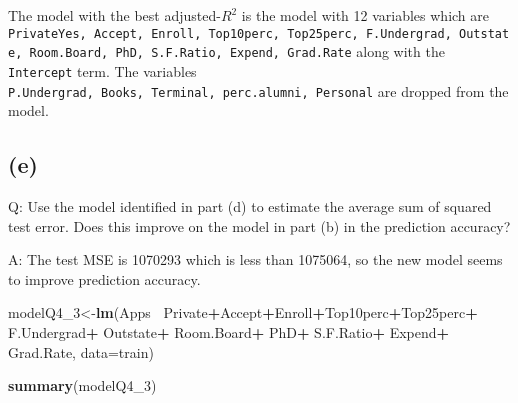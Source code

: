 \documentclass[
]{article}
\newenvironment{Shaded}{\begin{snugshade}}{\end{snugshade}}
\newcommand{\DataTypeTok}[1]{\textcolor[rgb]{0.13,0.29,0.53}{#1}}
\newcommand{\DecValTok}[1]{\textcolor[rgb]{0.00,0.00,0.81}{#1}}
\newcommand{\KeywordTok}[1]{\textcolor[rgb]{0.13,0.29,0.53}{\textbf{#1}}}
\newcommand{\NormalTok}[1]{#1}
\newcommand{\OperatorTok}[1]{\textcolor[rgb]{0.81,0.36,0.00}{\textbf{#1}}}
\newcommand{\StringTok}[1]{\textcolor[rgb]{0.31,0.60,0.02}{#1}}
\begin{document}
The model with the best adjusted-\(R^{2}\) is the model with 12
variables which are
\texttt{PrivateYes,\ Accept,\ Enroll,\ Top10perc,\ Top25perc,\ F.Undergrad,\ Outstate,\ Room.Board,\ PhD,\ S.F.Ratio,\ Expend,\ Grad.Rate}
along with the \texttt{Intercept} term. The variables
\texttt{P.Undergrad,\ Books,\ Terminal,\ perc.alumni,\ Personal} are
dropped from the model.


\hypertarget{e-1}{%
\subsection{(e)}\label{e-1}}

Q: Use the model identified in part (d) to estimate the average sum of
squared test error. Does this improve on the model in part (b) in the
prediction accuracy?

A: The test MSE is 1070293 which is less than 1075064, so the new model
seems to improve prediction accuracy.

\begin{Shaded}
\begin{Highlighting}[]
\NormalTok{modelQ4_}\DecValTok{3}\NormalTok{<-}\KeywordTok{lm}\NormalTok{(Apps}\OperatorTok{~}\StringTok{ }\NormalTok{Private}\OperatorTok{+}\NormalTok{Accept}\OperatorTok{+}\NormalTok{Enroll}\OperatorTok{+}\NormalTok{Top10perc}\OperatorTok{+}\NormalTok{Top25perc}\OperatorTok{+}\StringTok{ }\NormalTok{F.Undergrad}\OperatorTok{+}\StringTok{ }\NormalTok{Outstate}\OperatorTok{+}\StringTok{ }\NormalTok{Room.Board}\OperatorTok{+}\StringTok{ }\NormalTok{PhD}\OperatorTok{+}\StringTok{ }\NormalTok{S.F.Ratio}\OperatorTok{+}\StringTok{ }\NormalTok{Expend}\OperatorTok{+}\StringTok{ }\NormalTok{Grad.Rate, }\DataTypeTok{data=}\NormalTok{train)}

\KeywordTok{summary}\NormalTok{(modelQ4_}\DecValTok{3}\NormalTok{)}
\end{Highlighting}
\end{Shaded}
\end{document}
